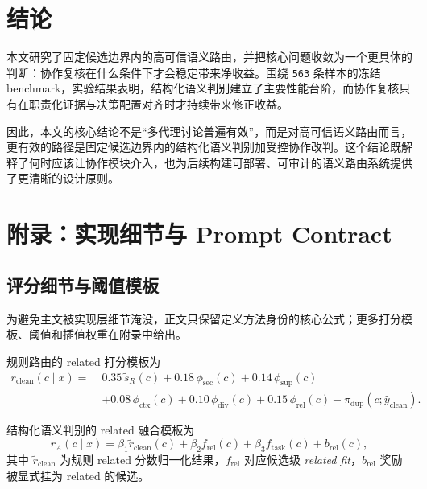 \documentclass[11pt,a4paper]{ctexart}
\begin{document}
\section{结论}

本文研究了固定候选边界内的高可信语义路由，并把核心问题收敛为一个更具体的判断：协作复核在什么条件下才会稳定带来净收益。围绕 \texttt{563} 条样本的冻结 benchmark，实验结果表明，结构化语义判别建立了主要性能台阶，而协作复核只有在职责化证据与决策配置对齐时才持续带来修正收益。

因此，本文的核心结论不是“多代理讨论普遍有效”，而是对高可信语义路由而言，更有效的路径是固定候选边界内的结构化语义判别加受控协作改判。这个结论既解释了何时应该让协作模块介入，也为后续构建可部署、可审计的语义路由系统提供了更清晰的设计原则。

\appendix
\section{附录：实现细节与 Prompt Contract}
\label{appendix:prompt-contracts}

\subsection{评分细节与阈值模板}

为避免主文被实现层细节淹没，正文只保留定义方法身份的核心公式；更多打分模板、阈值和插值权重在附录中给出。

规则路由的 related 打分模板为
\begin{equation}
\label{eq:appendix-clean-related}
\begin{aligned}
r_{\mathrm{clean}}(c\mid x)=\;&
0.35\,\tilde s_R(c)
+0.18\,\phi_{\mathrm{sec}}(c)
+0.14\,\phi_{\mathrm{sup}}(c)\\
&+0.08\,\phi_{\mathrm{ctx}}(c)
+0.10\,\phi_{\mathrm{div}}(c)
+0.15\,\phi_{\mathrm{rel}}(c)
-\pi_{\mathrm{dup}}(c;\hat y_{\mathrm{clean}}).
\end{aligned}
\end{equation}

结构化语义判别的 related 融合模板为
\begin{equation}
\label{eq:appendix-semantic-related}
r_A(c\mid x)=
\beta_1 \widetilde r_{\mathrm{clean}}(c)
+ \beta_2 f_{\mathrm{rel}}(c)
+ \beta_3 f_{\mathrm{task}}(c)
+ b_{\mathrm{rel}}(c),
\end{equation}
其中 $\widetilde r_{\mathrm{clean}}$ 为规则 related 分数归一化结果，$f_{\mathrm{rel}}$ 对应候选级 \emph{related fit}，$b_{\mathrm{rel}}$ 奖励被显式挂为 related 的候选。
\end{document}
